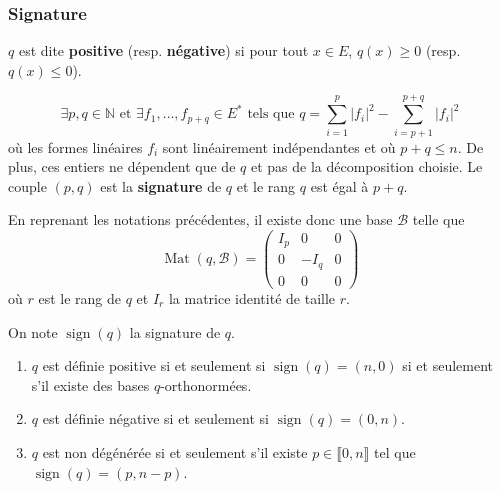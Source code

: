   \subsubsection{Signature}

  \begin{definition}
    $q$ est dite \textbf{positive} (resp. \textbf{négative}) si pour tout $x \in E$, $q(x) \geq 0$ (resp. $q(x) \leq 0$).
  \end{definition}


  \begin{theorem}
    \[ \exists p, q \in \mathbb{N} \text{ et } \exists f_1, \dots, f_{p+q} \in E^* \text{ tels que } q = \sum_{i=1}^p |f_i|^2 - \sum_{i=p+1}^{p+q} |f_i|^2 \]
    où les formes linéaires $f_i$ sont linéairement indépendantes et où $p + q \leq n$. De plus, ces entiers ne dépendent que de $q$ et pas de la décomposition choisie.
    \newpar
    Le couple $(p,q)$ est la \textbf{signature} de $q$ et le rang $q$ est égal à $p+q$.
  \end{theorem}

  \begin{remark}
    En reprenant les notations précédentes, il existe donc une base $\mathcal{B}$ telle que
    \[
    \operatorname{Mat}(q, \mathcal{B}) =
    \begin{pmatrix}
      I_p & 0 & 0 \\
      0 & -I_q & 0 \\
      0 & 0 & 0
    \end{pmatrix}
    \]
    où $r$ est le rang de $q$ et $I_r$ la matrice identité de taille $r$.
  \end{remark}


  \begin{corollary}
    On note $\operatorname{sign}(q)$ la signature de $q$.
    \begin{enumerate}[label={\bfseries(\roman*)}]
      \item $q$ est définie positive si et seulement si $\operatorname{sign}(q) = (n, 0)$ si et seulement s'il existe des bases $q$-orthonormées.
      \item $q$ est définie négative si et seulement si $\operatorname{sign}(q) = (0, n)$.
      \item $q$ est non dégénérée si et seulement s'il existe $p \in \llbracket 0,n \rrbracket$ tel que $\operatorname{sign}(q) = (p, n-p)$.
    \end{enumerate}
  \end{corollary}

